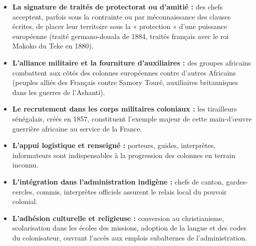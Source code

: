 \documentclass[11pt]{article}
\newcommand{\cle}[1]{{\popxbold\color{popdark}#1}}
\begin{document}
\begin{itemize}
    \item \textbf{La signature de traités de protectorat ou d'amitié :} des chefs acceptent, parfois sous la contrainte ou par méconnaissance des clauses écrites, de placer leur territoire sous la « protection » d'une puissance européenne (traité germano-douala de 1884, traités français avec le roi Makoko du Teke en 1880).
    \item \textbf{L'alliance militaire et la fourniture d'auxiliaires :} des groupes africains combattent aux côtés des colonnes européennes contre d'autres Africains (peuples alliés des Français contre Samory Touré, auxiliaires britanniques dans les guerres de l'Ashanti).
    \item \textbf{Le recrutement dans les corps militaires coloniaux :} les \cle{tirailleurs sénégalais}, créés en 1857, constituent l'exemple majeur de cette main-d'œuvre guerrière africaine au service de la France.
    \item \textbf{L'appui logistique et renseigné :} porteurs, guides, interprètes, informateurs sont indispensables à la progression des colonnes en terrain inconnu.
    \item \textbf{L'intégration dans l'administration indigène :} chefs de canton, gardes-cercles, commis, interprètes officiels assurent le relais local du pouvoir colonial.
    \item \textbf{L'adhésion culturelle et religieuse :} conversion au christianisme, scolarisation dans les écoles des missions, adoption de la langue et des codes du colonisateur, ouvrant l'accès aux emplois subalternes de l'administration.
\end{itemize}
\end{document}
